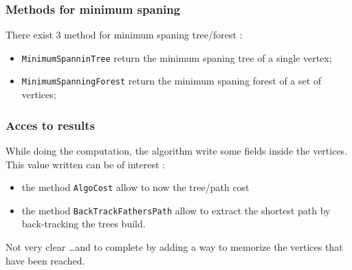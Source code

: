 \subsubsection{Methods for minimum spaning}

There exist $3$ method for minimum spaning tree/forest :

\begin{itemize}
   \item {\tt MinimumSpanninTree} return the minimum spaning tree of a single vertex;

   \item {\tt MinimumSpanningForest} return the minimum spaning forest of a set of vertices;

\end{itemize}


\subsubsection{Acces to results}

While doing the computation, the algorithm write some fields inside the vertices.
This value written can be of interest :

\begin{itemize}
   \item  the method {\tt AlgoCost}  allow to now the tree/path cost
   \item  the method {\tt BackTrackFathersPath}  allow to extract the shortest path
          by back-tracking  the trees build.
\end{itemize}

Not very clear \dots and to complete by adding a way to memorize the vertices that have been reached.










